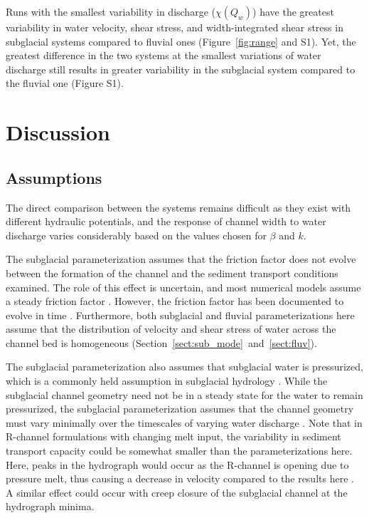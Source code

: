 \documentclass[11pt]{article}
\begin{document}
\begin{spacing}{1}
  Runs with the smallest variability in discharge ($\chi(Q_w)$) have the greatest variability in water velocity, shear stress, and width-integrated shear stress in subglacial systems compared to fluvial ones (Figure~\ref{fig:range} and S1).
  Yet, the greatest difference in the two systems at the smallest variations of water discharge still results in greater variability in the subglacial system compared to the fluvial one (Figure S1).

  \section{Discussion}
  \subsection{Assumptions}

  The direct comparison between the systems remains difficult as they exist with different hydraulic potentials, and the response of channel width to water discharge varies considerably based on the values chosen for $\beta$ and $k$.
  
  The subglacial parameterization assumes that the friction factor does not evolve between the formation of the channel and the sediment transport conditions examined.
  The role of this effect is uncertain, and most numerical models assume a steady friction factor \citep[e.g.][]{werder2013}. 
  However, the friction factor has been documented to evolve in time \citep{pohle2022}.
  Furthermore, both subglacial and fluvial parameterizations here assume that the distribution of velocity and shear stress of water across the channel bed is homogeneous (Section~\ref{sect:sub_mode}~and~\ref{sect:fluv}). 

  The subglacial parameterization also assumes that subglacial water is pressurized, which is a commonly held assumption in subglacial hydrology \citep[e.g.][]{gimbert2016}.
  While the subglacial channel geometry need not be in a steady state for the water to remain pressurized, the subglacial parameterization assumes that the channel geometry must vary minimally over the timescales of varying  water discharge \citep[e.g.][]{nanni2020}.
  Note that in R-channel formulations with changing melt input, the variability in sediment transport capacity could be somewhat smaller than the parameterizations here.
  Here, peaks in the hydrograph would occur as the R-channel is opening due to pressure melt, thus causing a decrease in velocity compared to the results here \citep{rothlisberger1972}.
  A similar effect could occur with creep closure of the subglacial channel at the hydrograph minima.
  

\end{spacing}
\end{document}
